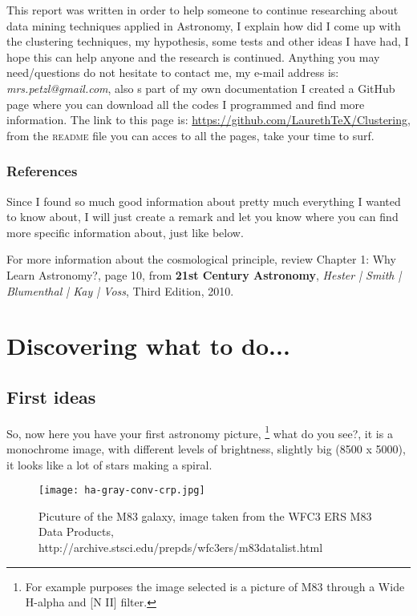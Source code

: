 \documentclass[11pt,fleqn]{book} %
\begin{document}
This report was written in order to help someone to continue researching about data mining techniques applied in Astronomy, I explain how did I come up with the clustering techniques, my hypothesis, some tests and other ideas I have had, I hope this can help anyone and the research is continued. Anything you may need/questions do not hesitate to contact me, my e-mail address is: \emph{mrs.petzl@gmail.com}, also s part of my own documentation I created a GitHub page where you can download all the codes I programmed and find more information. The link to this page is: \url{https://github.com/LaurethTeX/Clustering}, from the \textsc{readme} file you can acces to all the pages, take your time to surf.

\subsection{References}

Since I found so much good information about pretty much everything I wanted to know about, I will just create a remark and let you know where you can find more specific information about, just like below.

\begin{remark}
For more information about the cosmological principle, review Chapter 1: Why Learn Astronomy?, page 10, from \textbf{21st Century Astronomy}, \textit{Hester | Smith | Blumenthal | Kay | Voss}, Third Edition, 2010.
\end{remark}




\chapter{Discovering what to do...}

\section{First ideas}
So, now here you have your first astronomy picture, \footnote{For example purposes the image selected is a picture of M83 through a Wide H-alpha and [N II] filter. } what do you see?, it is a monochrome image, with different levels of brightness, slightly big (8500 x 5000), it looks like a lot of stars making a spiral.
\begin{figure}[h]
    \centering
    \texttt{[image: ha-gray-conv-crp.jpg]}
    \caption{Picuture of the M83 galaxy, image taken from the WFC3 ERS M83 Data Products, http://archive.stsci.edu/prepds/wfc3ers/m83datalist.html}
    \label{fig:awesome_image}
\end{figure}
\end{document}
